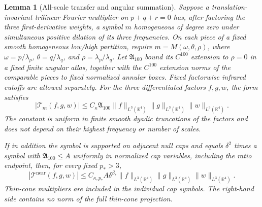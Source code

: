 \documentclass[11pt,a4paper]{article}
\numberwithin{equation}{section}
\newcommand{\R}{\mathbb R}
\newtheorem{lemma}[theorem]{Lemma}
\theoremstyle{definition}
\begin{document}
\begin{lemma}[All-scale transfer and angular summation]\label{lem:analytic-near}
Suppose a translation-invariant trilinear Fourier multiplier on
$p+q+r=0$ has, after factoring the three first-derivative weights,
a symbol $m$ homogeneous of degree zero under simultaneous positive
dilation of its three frequencies. On each piece of a fixed smooth
homogeneous low/high partition, require
$m=M(\omega,\theta,\rho)$, where $\omega=p/\lambda_p$, $\theta=q/\lambda_q$, and
$\rho=\lambda_p/\lambda_q$. Let $\mathfrak A_{100}$ bound its $C^{100}$ extension to
$\rho=0$ in a fixed finite angular atlas, together with the
$C^{100}$ extension norms of the comparable pieces to fixed normalized
annular boxes. Fixed factorwise infrared cutoffs are allowed separately.
For the three differentiated factors $f,g,w$, the form satisfies
\begin{equation}\label{eq:analytic-near-statement-2}
|\mathcal T_m(f,g,w)|
\leq C_\kappa\mathfrak A_{100}
\|f\|_{L^3(\R^4)}\|g\|_{L^3(\R^4)}\|w\|_{L^3(\R^4)}.
\end{equation}
The constant is uniform in
finite smooth dyadic truncations of the factors and does not depend on their
highest frequency or number of scales.

If in addition the symbol is supported on adjacent null caps and equals
$\delta^2$ times a symbol with $\mathfrak A_{100}\leq A$ uniformly in
normalized cap variables, including the ratio endpoint, then, for
every fixed $p_*>3$,
\begin{equation}\label{eq:analytic-near-bound}
|\mathcal T^{\mathrm{near}}(f,g,w)|
\leq C_{\kappa,p_*}A\delta^{\beta_*}\|f\|_{L^3(\R^4)}\|g\|_{L^3(\R^4)}\|w\|_{L^3(\R^4)}.
\end{equation}
Thin-cone multipliers are included in the individual cap symbols. The
right-hand side contains no norm of the full thin-cone projection.
\end{lemma}
\end{document}
